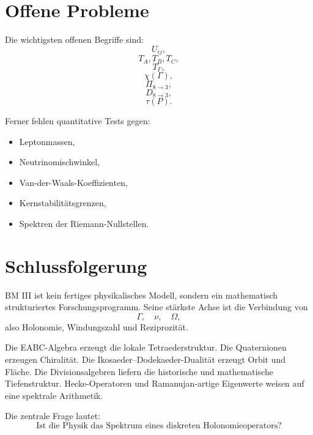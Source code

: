 \documentclass[11pt,a4paper]{article}
\theoremstyle{definition}
\begin{document}
	\section{Offene Probleme}
	
	Die wichtigsten offenen Begriffe sind:
	\[
	U_{ij},
	\]
	\[
	T_A,T_B,T_C,
	\]
	\[
	T_\Gamma,
	\]
	\[
	\chi(\Gamma),
	\]
	\[
	\Pi_{8\to3},
	\]
	\[
	D_{8\to3},
	\]
	\[
	\tau(P).
	\]
	
	Ferner fehlen quantitative Tests gegen:
	\begin{itemize}
		\item Leptonmassen,
		\item Neutrinomischwinkel,
		\item Van-der-Waals-Koeffizienten,
		\item Kernstabilitätsgrenzen,
		\item Spektren der Riemann-Nullstellen.
	\end{itemize}
	
	\section{Schlussfolgerung}
	
	BM III ist kein fertiges physikalisches Modell, sondern ein mathematisch strukturiertes Forschungsprogramm. Seine stärkste Achse ist die Verbindung von
	\[
	\Gamma,\quad \nu,\quad \Omega,
	\]
	also Holonomie, Windungszahl und Reziprozität.
	
	Die EABC-Algebra erzeugt die lokale Tetraederstruktur. Die Quaternionen erzeugen Chiralität. Die Ikosaeder--Dodekaeder-Dualität erzeugt Orbit und Fläche. Die Divisionsalgebren liefern die historische und mathematische Tiefenstruktur. Hecke-Operatoren und Ramanujan-artige Eigenwerte weisen auf eine spektrale Arithmetik.
	
	Die zentrale Frage lautet:
	\[
	\boxed{
		\text{Ist die Physik das Spektrum eines diskreten Holonomieoperators?}
	}
	\]
	
\end{document}
